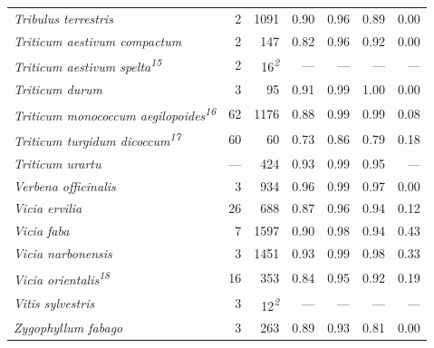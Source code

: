 \documentclass[
  authoryear,
  preprint]{elsarticle}
\begin{document}
\begin{longtable}{@{\extracolsep{\fill}}lrrrrrr}
{\itshape Tribulus terrestris} & 2 & 1091 & 0.90 & 0.96 & 0.89 & 0.00 \\ 
{\itshape Triticum aestivum compactum} & 2 & 147 & 0.82 & 0.96 & 0.92 & 0.00 \\ 
{\itshape Triticum aestivum spelta}\textsuperscript{\textit{15}} & 2 & 16\textsuperscript{\textit{2}} & — & — & — & — \\ 
{\itshape Triticum durum} & 3 & 95 & 0.91 & 0.99 & 1.00 & 0.00 \\ 
{\itshape Triticum monococcum aegilopoides}\textsuperscript{\textit{16}} & 62 & 1176 & 0.88 & 0.99 & 0.99 & 0.08 \\ 
{\itshape Triticum turgidum dicoccum}\textsuperscript{\textit{17}} & 60 & 60 & 0.73 & 0.86 & 0.79 & 0.18 \\ 
{\itshape Triticum urartu} & — & 424 & 0.93 & 0.99 & 0.95 & — \\ 
{\itshape Verbena officinalis} & 3 & 934 & 0.96 & 0.99 & 0.97 & 0.00 \\ 
{\itshape Vicia ervilia} & 26 & 688 & 0.87 & 0.96 & 0.94 & 0.12 \\ 
{\itshape Vicia faba} & 7 & 1597 & 0.90 & 0.98 & 0.94 & 0.43 \\ 
{\itshape Vicia narbonensis} & 3 & 1451 & 0.93 & 0.99 & 0.98 & 0.33 \\ 
{\itshape Vicia orientalis}\textsuperscript{\textit{18}} & 16 & 353 & 0.84 & 0.95 & 0.92 & 0.19 \\ 
{\itshape Vitis sylvestris} & 3 & 12\textsuperscript{\textit{2}} & — & — & — & — \\ 
{\itshape Zygophyllum fabago} & 3 & 263 & 0.89 & 0.93 & 0.81 & 0.00 \\ 
\bottomrule

\end{longtable}
\end{document}
